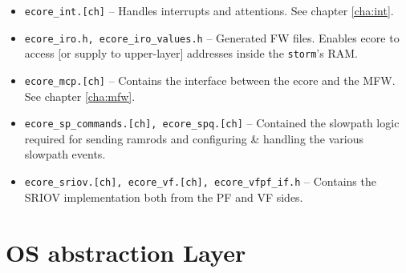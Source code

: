 \documentclass[11pt,fleqn,hidelinks,oneside]{book} %
\begin{document}
\begin{itemize}
	\item \texttt{ecore\_int.[ch]} -- Handles interrupts and attentions. See chapter \ref{cha:int}.

	\item \texttt{ecore\_iro.h, ecore\_iro\_values.h} -- Generated FW files. Enables ecore to access [or supply to upper-layer] addresses inside the \texttt{storm}'s RAM.

	\item \texttt{ecore\_mcp.[ch]} -- Contains the interface between the ecore and the MFW. See chapter \ref{cha:mfw}.

	\item \texttt{ecore\_sp\_commands.[ch], ecore\_spq.[ch]} -- Contained the slowpath logic required for sending ramrods and configuring \& handling the various slowpath events.
	
	\item \texttt{ecore\_sriov.[ch], ecore\_vf.[ch], ecore\_vfpf\_if.h} -- Contains the SRIOV implementation both from the PF and VF sides.
\end{itemize}

\section{OS abstraction Layer}
\label{sec:osal}

\end{document}
